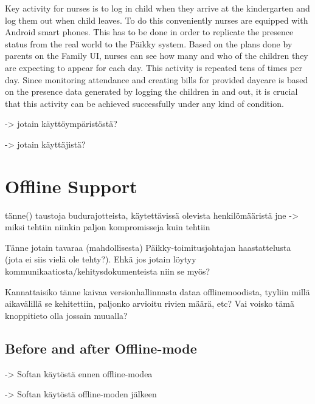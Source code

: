 Key activity for nurses is to log in child when they arrive at the kindergarten and log them out when child leaves. To do this conveniently nurses are equipped with Android smart phones. This has to be done in order to replicate the presence status from the real world to the Päikky system. Based on the plans done by parents on the Family UI, nurses can see how many and who of the children they are expecting to appear for each day. This activity is repeated tens of times per day. Since monitoring attendance and creating bills for provided daycare is based on the presence data generated by logging the children in and out, it is crucial that this activity can be achieved successfully under any kind of condition.

-> jotain käyttöympäristöstä?

-> jotain käyttäjistä?

\section{Offline Support}
tänne() taustoja budurajotteista, käytettävissä olevista henkilömääristä jne -> miksi tehtiin niinkin paljon kompromisseja kuin tehtiin

Tänne jotain tavaraa (mahdollisesta) Päikky-toimitusjohtajan haastattelusta (jota ei siis vielä ole tehty?). Ehkä jos jotain löytyy kommunikaatiosta/kehitysdokumenteista niin se myös?

Kannattaisiko tänne kaivaa versionhallinnasta dataa offlinemoodista, tyyliin millä aikavälillä se kehitettiin, paljonko arvioitu rivien määrä, etc? Vai voisko tämä knoppitieto olla jossain muualla?

\subsection{Before and after Offline-mode}

-> Softan käytöstä ennen offline-modea

-> Softan käytöstä offline-moden jälkeen







